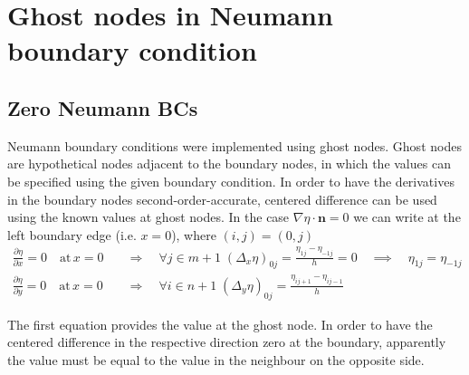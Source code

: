 \section*{Ghost nodes in Neumann boundary condition}

\subsection*{Zero Neumann BCs}
Neumann boundary conditions were implemented using ghost nodes. Ghost nodes are hypothetical nodes adjacent to the boundary nodes, in which the values can be specified using the given boundary condition. In order to have the derivatives in the boundary nodes second-order-accurate, centered difference can be used using the known values at ghost nodes. In the case $\nabla\eta\cdot\bm{n}=0$ we can write at the left boundary edge (i.e. $x=0$), where $(i,j)=(0,j)$
\begin{equation} \label{eq_neumanBC_ghost_pts_value}
	\begin{split}
		\frac{\partial \eta}{\partial x}=0 \quad \mathrm{at}\,x=0 \quad &\Rightarrow\quad \forall j\in m+1 \; (\Delta_x\eta)_{0j} = \frac{\eta_{1j}-\eta_{-1j}}{h} = 0 \quad \implies\quad \eta_{1j}=\eta_{-1j} \\
		\frac{\partial \eta}{\partial y}=0 \quad \mathrm{at}\,x=0 \quad &\Rightarrow\quad \forall i\in n+1 \; (\Delta_y\eta)_{0j}= \frac{\eta_{ij+1}-\eta_{ij-1}}{h}  
	\end{split}
\end{equation}

The first equation provides the value at the ghost node. In order to have the centered difference in the respective direction zero at the boundary, apparently the value must be equal to the value in the neighbour on the opposite side.

